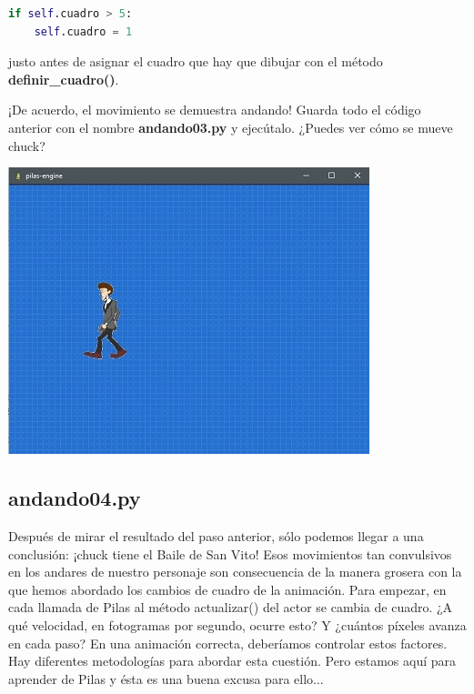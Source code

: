\documentclass{article}
\begin{document}
\begin{lstlisting}[language=Python]
if self.cuadro > 5:
    self.cuadro = 1
\end{lstlisting}
\vspace{\baselineskip}
justo antes de asignar el cuadro que hay que dibujar con el método \textbf{definir\_cuadro()}.\par
¡De acuerdo, el movimiento se demuestra andando! Guarda todo el código anterior con el nombre \textbf{andando03.py} y ejecútalo. ¿Puedes ver cómo se mueve chuck?\par

\vspace{\baselineskip}
\includegraphics{andando02}

\subsection{andando04.py}

Después de mirar el resultado del paso anterior, sólo podemos llegar a una conclusión:
¡chuck tiene el Baile de San Vito!
Esos movimientos tan convulsivos en los andares de nuestro personaje son consecuencia
de la manera grosera con la que hemos abordado los cambios de cuadro de la animación.
Para empezar, en cada llamada de Pilas al método actualizar() del actor se cambia de
cuadro. ¿A qué velocidad, en fotogramas por segundo, ocurre esto? Y ¿cuántos píxeles
avanza en cada paso? En una animación correcta, deberíamos controlar estos factores.
Hay diferentes metodologías para abordar esta cuestión. Pero estamos aquí para aprender
de Pilas y ésta es una buena excusa para ello...\par

\vspace{\baselineskip}
\end{document}
